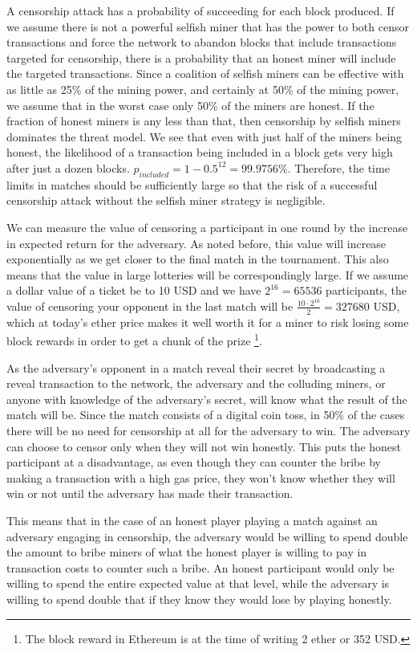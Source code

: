 A censorship attack has a probability of succeeding for each block produced. If we assume there is not a powerful selfish miner that has the power to both censor transactions and force the network to abandon blocks that include transactions targeted for censorship, there is a probability that an honest miner will include the targeted transactions. Since a coalition of selfish miners can be effective with as little as 25\% of the mining power, and certainly at 50\% of the mining power, we assume that in the worst case only 50\% of the miners are honest. If the fraction of honest miners is any less than that, then censorship by selfish miners dominates the threat model. We see that even with just half of the miners being honest, the likelihood of a transaction being included in a block gets very high after just a dozen blocks. $p_{included} = 1-0.5^{12}=99.9756\%$. Therefore, the time limits in matches should be sufficiently large so that the risk of a successful censorship attack without the selfish miner strategy is negligible.

We can measure the value of censoring a participant in one round by the increase in expected return for the adversary. As noted before, this value will increase exponentially as we get closer to the final match in the tournament. This also means that the value in large lotteries will be correspondingly large. If we assume a dollar value of a ticket be to 10 USD and we have $2^{16}=65536$ participants, the value of censoring your opponent in the last match will be $\frac{10 \cdot 2^{16}}{2}=327680$ USD, which at today's ether price makes it well worth it for a miner to risk losing some block rewards in order to get a chunk of the prize \footnote{The block reward in Ethereum is at the time of writing 2 ether or 352 USD.}.

As the adversary's opponent in a match reveal their secret by broadcasting a reveal transaction to the network, the adversary and the colluding miners, or anyone with knowledge of the adversary's secret, will know what the result of the match will be. Since the match consists of a digital coin toss, in 50\% of the cases there will be no need for censorship at all for the adversary to win. The adversary can choose to censor only when they will not win honestly. This puts the honest participant at a disadvantage, as even though they can counter the bribe by making a transaction with a high gas price, they won't know whether they will win or not until the adversary has made their transaction.

This means that in the case of an honest player playing a match against an adversary engaging in censorship, the adversary would be willing to spend double the amount to bribe miners of what the honest player is willing to pay in transaction costs to counter such a bribe. An honest participant would only be willing to spend the entire expected value at that level, while the adversary is willing to spend double that if they know they would lose by playing honestly.

